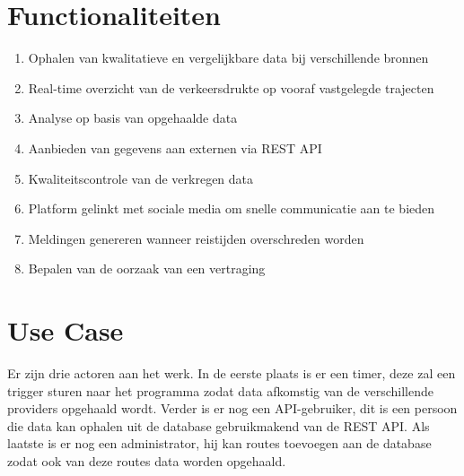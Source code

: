 \documentclass[ps,a4paper,oneside]{report}
\begin{document}
\section{Functionaliteiten}
\begin{enumerate}
\item Ophalen van kwalitatieve en vergelijkbare data bij verschillende bronnen
\item Real-time overzicht van de verkeersdrukte op vooraf vastgelegde trajecten
\item Analyse op basis van opgehaalde data
\item Aanbieden van gegevens aan externen via REST API
\item Kwaliteitscontrole van de verkregen data
\item Platform gelinkt met sociale media om snelle communicatie aan te bieden
\item Meldingen genereren wanneer reistijden overschreden worden
\item Bepalen van de oorzaak van een vertraging
\end{enumerate}
\section{Use Case}
Er zijn drie actoren aan het werk. In de eerste plaats is er een timer, deze zal een trigger sturen naar het programma zodat data afkomstig van de verschillende providers opgehaald wordt. Verder is er nog een API-gebruiker, dit is een persoon die data kan ophalen uit de database gebruikmakend van de REST API. Als laatste is er nog een administrator, hij kan routes toevoegen aan de database zodat ook van deze routes data worden opgehaald.
\end{document}
